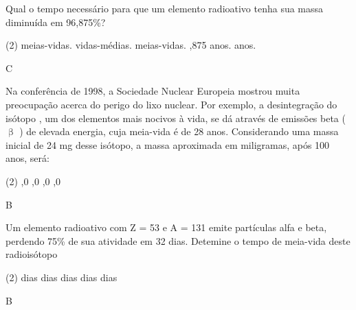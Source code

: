 \documentclass[9 pt]{scrartcl}
\begin{document}
\begin{exercise}[points=1.0]
Qual o tempo necessário para que um elemento radioativo tenha sua massa diminuída em 96,875\%?

\begin{choice}(2)
 meias-vidas.
 vidas-médias.
 meias-vidas.
,875 anos.
 anos.
\end{choice}
\end{exercise}
\begin{solution}
C
\end{solution}





\begin{exercise}[points=1.0]
Na conferência de 1998, a Sociedade Nuclear Europeia mostrou muita preocupação acerca do perigo do lixo nuclear. Por exemplo, a desintegração do isótopo , um dos elementos mais nocivos à vida, se dá através de emissões beta (\(\upbeta\) ) de elevada energia, cuja meia-vida é de 28 anos. Considerando uma massa inicial de 24 mg desse isótopo, a massa aproximada em miligramas, após 100 anos, será:

\begin{choice}(2)
,0
,0
,0
,0
\end{choice}
\end{exercise}
\begin{solution}
B
\end{solution}





\begin{exercise}[points=1.0]
Um elemento radioativo com Z = 53 e A = 131 emite partículas alfa e beta, perdendo 75\% de sua atividade em 32 dias. Detemine o tempo de meia-vida deste radioisótopo

\begin{choice}(2)
 dias
 dias
 dias
 dias
 dias
\end{choice}
\end{exercise}
\begin{solution}
B
\end{solution}
\end{document}
